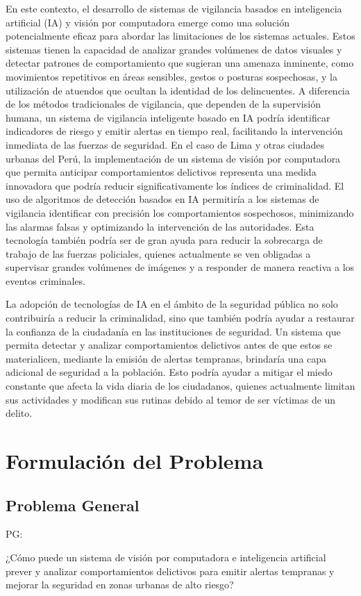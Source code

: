 En este contexto, el desarrollo de sistemas de vigilancia basados en inteligencia artificial (IA) y visión por computadora emerge como una solución potencialmente eficaz para abordar las limitaciones de los sistemas actuales. Estos sistemas tienen la capacidad de analizar grandes volúmenes de datos visuales y detectar patrones de comportamiento que sugieran una amenaza inminente, como movimientos repetitivos en áreas sensibles, gestos o posturas sospechosas, y la utilización de atuendos que ocultan la identidad de los delincuentes. A diferencia de los métodos tradicionales de vigilancia, que dependen de la supervisión humana, un sistema de vigilancia inteligente basado en IA podría identificar indicadores de riesgo y emitir alertas en tiempo real, facilitando la intervención inmediata de las fuerzas de seguridad.
En el caso de Lima y otras ciudades urbanas del Perú, la implementación de un sistema de visión por computadora que permita anticipar comportamientos delictivos representa una medida innovadora que podría reducir significativamente los índices de criminalidad. El uso de algoritmos de detección basados en IA permitiría a los sistemas de vigilancia identificar con precisión los comportamientos sospechosos, minimizando las alarmas falsas y optimizando la intervención de las autoridades. Esta tecnología también podría ser de gran ayuda para reducir la sobrecarga de trabajo de las fuerzas policiales, quienes actualmente se ven obligadas a supervisar grandes volúmenes de imágenes y a responder de manera reactiva a los eventos criminales.

La adopción de tecnologías de IA en el ámbito de la seguridad pública no solo contribuiría a reducir la criminalidad, sino que también podría ayudar a restaurar la confianza de la ciudadanía en las instituciones de seguridad. Un sistema que permita detectar y analizar comportamientos delictivos antes de que estos se materialicen, mediante la emisión de alertas tempranas, brindaría una capa adicional de seguridad a la población. Esto podría ayudar a mitigar el miedo constante que afecta la vida diaria de los ciudadanos, quienes actualmente limitan sus actividades y modifican sus rutinas debido al temor de ser víctimas de un delito.



\section{Formulación del Problema}

\subsection{Problema General}
PG: \newcommand{\ProblemaGeneral}{
¿Cómo puede un sistema de visión por computadora e inteligencia artificial prever y analizar comportamientos delictivos para emitir alertas tempranas y mejorar la seguridad en zonas urbanas de alto riesgo?
}
\ProblemaGeneral

